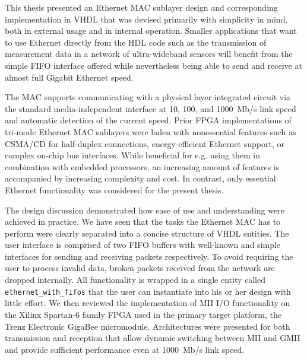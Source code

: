 \documentclass[a4paper, 11pt, oneside]{Thesis}  %
\begin{document}
This thesis presented an Ethernet MAC sublayer design and corresponding implementation in VHDL that was devised primarily with simplicity in mind, both in external usage and in internal operation. Smaller applications that want to use Ethernet directly from the HDL code such as the transmission of measurement data in a network of ultra-wideband sensors will benefit from the simple FIFO interface offered while nevertheless being able to send and receive at almost full Gigabit Ethernet speed.

The MAC supports communicating with a physical layer integrated circuit via the standard media-independent interface at 10, 100, and 1000~Mb/s link speed and automatic detection of the current speed. Prior FPGA implementations of tri-mode Ethernet MAC sublayers were laden with nonessential features such as CSMA/CD for half-duplex connections, energy-efficient Ethernet support, or complex on-chip bus interfaces. While beneficial for e.g. using them in combination with embedded processors, an increasing amount of features is accompanied by increasing complexity and cost. In contrast, only essential Ethernet functionality was considered for the present thesis.


The design discussion demonstrated how ease of use and understanding were achieved in practice. We have seen that the tasks the Ethernet MAC has to perform were clearly separated into a concise structure of VHDL entities. The user interface is comprised of two FIFO buffers with well-known and simple interfaces for sending and receiving packets respectively. To avoid requiring the user to process invalid data, broken packets received from the network are dropped internally. All functionality is wrapped in a single  entity called \texttt{ethernet\_with\_fifos} that the user can instantiate into his or her design with little effort.
\clearpage
We then reviewed the implementation of MII I/O functionality on the Xilinx Spartan-6 family FPGA used in the primary target platform, the Trenz Electronic GigaBee micromodule. Architectures were presented for both transmission and reception that allow dynamic switching between MII and GMII and provide sufficient performance even at 1000~Mb/s link speed.
\end{document}

